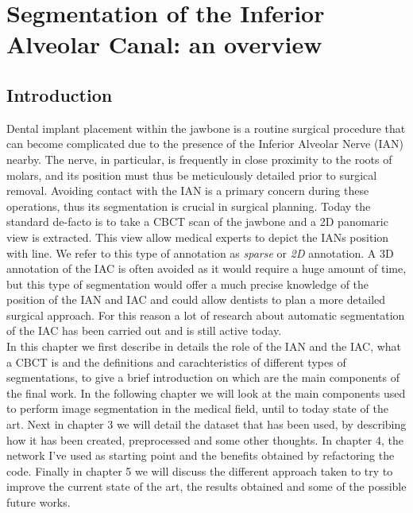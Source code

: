 
\chapter{Segmentation of the Inferior Alveolar Canal: an overview}

\label{chp:introductive_chapter}

\def\:{\hskip0pt} %

\section{Introduction}
Dental implant placement within the jawbone is a routine surgical procedure that
can become complicated due to the presence of the Inferior Alveolar Nerve (IAN)
nearby. The nerve, in particular, is frequently in close proximity to the roots
of molars, and its position must thus be meticulously detailed prior to surgical
removal. Avoiding contact with the IAN is a primary concern during these
operations, thus its segmentation is crucial in surgical planning.
Today the standard de-facto is to take a CBCT scan of the jawbone and a 2D
panomaric view is extracted. This view allow medical experts to depict the IANs
position with line. We refer to this type of annotation as \emph{sparse} or
\emph{2D} annotation. A 3D annotation of the IAC is often avoided as it would
require a huge amount of time, but this type of segmentation would offer a much
precise knowledge of the position of the IAN and IAC and could allow dentists to
plan a more detailed surgical approach. For this reason a lot of research about
automatic segmentation of the IAC has been carried out and is still active today.\\

In this chapter we first describe in details the role of the IAN and the IAC,
what a CBCT is and the definitions and carachteristics of different types of
segmentations, to give a brief introduction on which are the main components of the final work.
In the following chapter we will look at the main components used to perform
image segmentation in the medical field, until to today state of the art.
Next in chapter 3 we will detail the dataset that has been used, by describing
how it has been created, preprocessed and some other thoughts.
In chapter 4, the network I've used as starting point and the benefits obtained
by refactoring the code.
Finally in chapter 5 we will discuss the different approach taken to try to
improve the current state of the art, the results obtained and some of the
possible future works.

